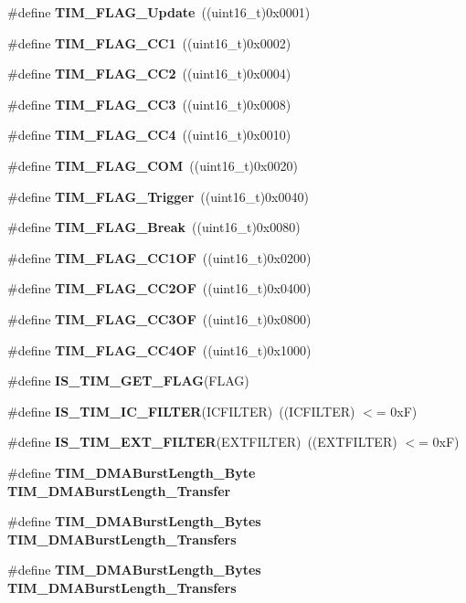 \begin{DoxyCompactItemize}
\item 
\#define \textbf{ T\+I\+M\+\_\+\+F\+L\+A\+G\+\_\+\+Update}~((uint16\+\_\+t)0x0001)
\item 
\#define \textbf{ T\+I\+M\+\_\+\+F\+L\+A\+G\+\_\+\+C\+C1}~((uint16\+\_\+t)0x0002)
\item 
\#define \textbf{ T\+I\+M\+\_\+\+F\+L\+A\+G\+\_\+\+C\+C2}~((uint16\+\_\+t)0x0004)
\item 
\#define \textbf{ T\+I\+M\+\_\+\+F\+L\+A\+G\+\_\+\+C\+C3}~((uint16\+\_\+t)0x0008)
\item 
\#define \textbf{ T\+I\+M\+\_\+\+F\+L\+A\+G\+\_\+\+C\+C4}~((uint16\+\_\+t)0x0010)
\item 
\#define \textbf{ T\+I\+M\+\_\+\+F\+L\+A\+G\+\_\+\+C\+OM}~((uint16\+\_\+t)0x0020)
\item 
\#define \textbf{ T\+I\+M\+\_\+\+F\+L\+A\+G\+\_\+\+Trigger}~((uint16\+\_\+t)0x0040)
\item 
\#define \textbf{ T\+I\+M\+\_\+\+F\+L\+A\+G\+\_\+\+Break}~((uint16\+\_\+t)0x0080)
\item 
\#define \textbf{ T\+I\+M\+\_\+\+F\+L\+A\+G\+\_\+\+C\+C1\+OF}~((uint16\+\_\+t)0x0200)
\item 
\#define \textbf{ T\+I\+M\+\_\+\+F\+L\+A\+G\+\_\+\+C\+C2\+OF}~((uint16\+\_\+t)0x0400)
\item 
\#define \textbf{ T\+I\+M\+\_\+\+F\+L\+A\+G\+\_\+\+C\+C3\+OF}~((uint16\+\_\+t)0x0800)
\item 
\#define \textbf{ T\+I\+M\+\_\+\+F\+L\+A\+G\+\_\+\+C\+C4\+OF}~((uint16\+\_\+t)0x1000)
\item 
\#define \textbf{ I\+S\+\_\+\+T\+I\+M\+\_\+\+G\+E\+T\+\_\+\+F\+L\+AG}(F\+L\+AG)
\item 
\#define \textbf{ I\+S\+\_\+\+T\+I\+M\+\_\+\+I\+C\+\_\+\+F\+I\+L\+T\+ER}(I\+C\+F\+I\+L\+T\+ER)~((I\+C\+F\+I\+L\+T\+ER) $<$= 0x\+F)
\item 
\#define \textbf{ I\+S\+\_\+\+T\+I\+M\+\_\+\+E\+X\+T\+\_\+\+F\+I\+L\+T\+ER}(E\+X\+T\+F\+I\+L\+T\+ER)~((E\+X\+T\+F\+I\+L\+T\+ER) $<$= 0x\+F)
\item 
\#define \textbf{ T\+I\+M\+\_\+\+D\+M\+A\+Burst\+Length\+\_\+Byte}~\textbf{ T\+I\+M\+\_\+\+D\+M\+A\+Burst\+Length\+\_\+Transfer}
\item 
\#define \textbf{ T\+I\+M\+\_\+\+D\+M\+A\+Burst\+Length\+\_\+Bytes}~\textbf{ T\+I\+M\+\_\+\+D\+M\+A\+Burst\+Length\+\_\+Transfers}
\item 
\#define \textbf{ T\+I\+M\+\_\+\+D\+M\+A\+Burst\+Length\+\_\+Bytes}~\textbf{ T\+I\+M\+\_\+\+D\+M\+A\+Burst\+Length\+\_\+Transfers}

\end{DoxyCompactItemize}

